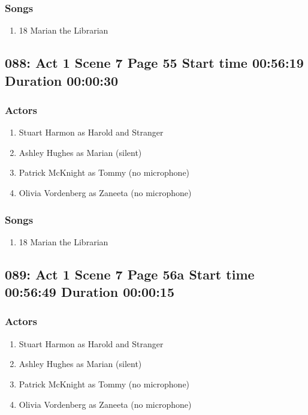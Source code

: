 \subsubsection{Songs}
\begin{enumerate}
\item 18 Marian the Librarian
\end{enumerate}
\subsection{088: Act 1 Scene 7 Page 55 Start time 00:56:19 Duration 00:00:30}

\subsubsection{Actors}
\begin{enumerate}
\item Stuart Harmon as Harold and Stranger
\item Ashley Hughes as Marian (silent)
\item Patrick McKnight as Tommy (no microphone)
\item Olivia Vordenberg as Zaneeta (no microphone)
\end{enumerate}

\subsubsection{Songs}
\begin{enumerate}
\item 18 Marian the Librarian
\end{enumerate}
\subsection{089: Act 1 Scene 7 Page 56a Start time 00:56:49 Duration 00:00:15}

\subsubsection{Actors}
\begin{enumerate}
\item Stuart Harmon as Harold and Stranger
\item Ashley Hughes as Marian (silent)
\item Patrick McKnight as Tommy (no microphone)
\item Olivia Vordenberg as Zaneeta (no microphone)
\end{enumerate}

